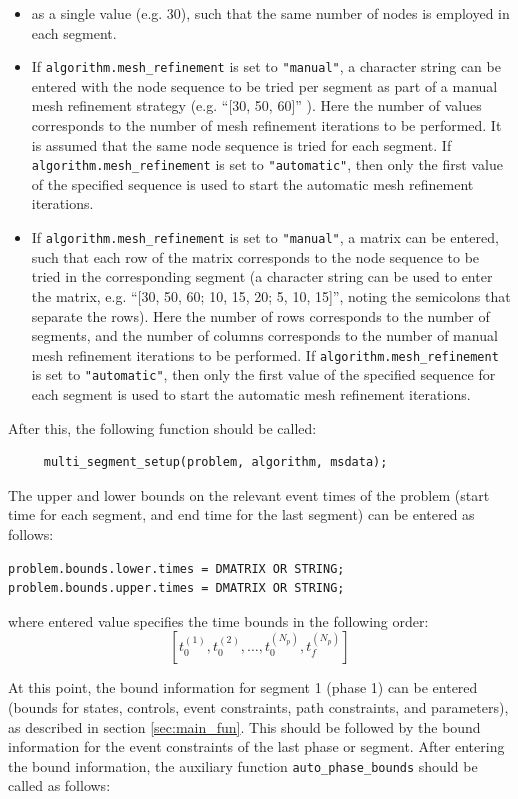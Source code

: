 \documentclass[a4paper,11pt]{report}    %
\begin{document}
\begin{itemize} \item as a single value (e.g. 30), such that the same number of nodes is employed in each segment.
\item If \verb|algorithm.mesh_refinement| is set to \verb|"manual"|,  a character string can be entered with the node sequence to be tried per segment as
part of a manual mesh refinement strategy (e.g. ``[30, 50, 60]'' ). Here the number of values corresponds to the number of mesh refinement iterations to be performed. 
It is assumed that the same node sequence is tried for each segment.  
If \verb|algorithm.mesh_refinement| is set to \verb|"automatic"|, then only the first value
of the specified sequence is used to start the automatic mesh refinement iterations.
\item  If \verb|algorithm.mesh_refinement| is set to \verb|"manual"|,  a matrix can be entered, such that each row of the matrix corresponds to the node sequence to be tried  
in the corresponding segment (a character string can be used to enter the matrix, e.g. ``[30, 50, 60;  10, 15, 20; 5, 10, 15]'', noting the semicolons that separate the rows). 
Here the number of rows corresponds to the number of segments, and the number of columns corresponds to the number of manual
mesh refinement iterations to be performed. If \verb|algorithm.mesh_refinement| is set to \verb|"automatic"|, then only the first value 
of the specified sequence for each segment is used to start the automatic mesh refinement iterations.
\end{itemize}



After this, the following function should be called:

\begin{verbatim}
     multi_segment_setup(problem, algorithm, msdata);
\end{verbatim}

The upper and lower bounds on the relevant event times of the problem (start time for each segment,
and end time for the last segment) can be entered as follows:
\begin{verbatim}
problem.bounds.lower.times = DMATRIX OR STRING;
problem.bounds.upper.times = DMATRIX OR STRING;
\end{verbatim}
where entered value specifies the time bounds in the following order:
\[
[t_0^{(1)}, t_0^{(2)}, \ldots, t_0^{(N_p)}, t_f^{(N_p)}]
\]

At this point, the bound information for segment 1 (phase 1)
can be entered (bounds for states, controls, event constraints, path constraints, and parameters), as described
in section \ref{sec:main_fun}. This should be followed by the bound information for the event constraints of the last phase or segment. 
After entering the bound information, the auxiliary function \verb|auto_phase_bounds| should be called
as follows:
\end{document}
